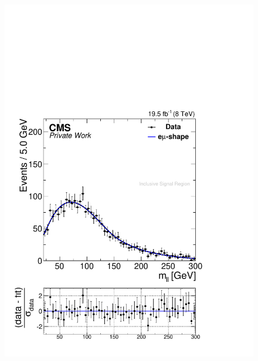 \begin{figure}[hbp]
\begin{minipage}[t]{0.49\textwidth}
    \includegraphics[width=\textwidth]{plots/results/fit/fit2012OFOS_ETHTriangle_SignalInclusive_Combined_Full2012_ETHTriangle_Central.pdf}
  \end{minipage}
  \begin{minipage}[t]{0.49\textwidth}

\end{minipage}
\end{figure}

